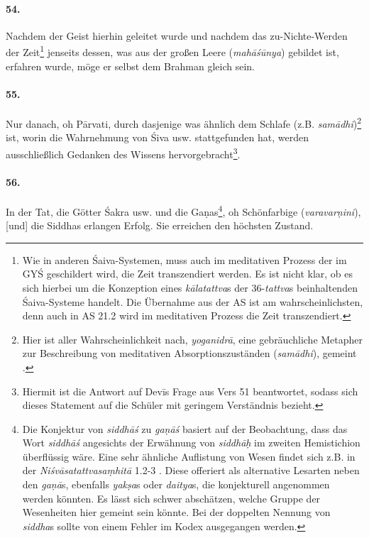 \documentclass[a4paper,12pt]{article}
\begin{document}
\paragraph{54.} Nachdem der Geist hierhin geleitet wurde und nachdem das zu-Nichte-Werden der Zeit\footnote{Wie in anderen Śaiva-Systemen, muss auch im meditativen Prozess der im GYŚ geschildert wird, die Zeit transzendiert werden. Es ist nicht klar, ob es sich hierbei um die Konzeption eines \textit{kālatattva}s der 36-\textit{tattva}s beinhaltenden Śaiva-Systeme handelt. Die Übernahme aus der AS ist am wahrscheinlichsten, denn auch in AS 21.2 wird im meditativen Prozess die Zeit transzendiert.} jenseits dessen, was aus der großen Leere (\textit{mahāśūnya}) gebildet ist, erfahren wurde, möge er selbst dem Brahman gleich sein.

\paragraph{55.} Nur danach, oh Pārvati, durch dasjenige was ähnlich dem Schlafe (z.B. \textit{samādhi})\footnote{Hier ist aller Wahrscheinlichkeit nach, \textit{yoganidrā}, eine gebräuchliche Metapher zur Beschreibung von meditativen Absorptionszuständen (\textit{samādhi}), gemeint \parencite[4]{birch2014}.} ist, worin die Wahrnehmung von Śiva usw. stattgefunden hat, werden ausschließlich Gedanken des Wissens hervorgebracht\footnote{Hiermit ist die Antwort auf Devīs Frage aus Vers 51 beantwortet, sodass sich dieses Statement auf die Schüler mit geringem Verständnis bezieht.}.

\paragraph{56.} In der Tat, die Götter Śakra usw. und die Gaṇas\footnote{Die Konjektur von \textit{siddhāś} zu \textit{gaṇāś} basiert auf der Beobachtung, dass das Wort \textit{siddhāś} angesichts der Erwähnung von \textit{siddhāḥ} im zweiten Hemistichion überflüssig wäre. Eine sehr ähnliche Auflistung von Wesen findet sich z.B. in der \textit{Niśvāsatattvasaṃhitā} 1.2-3 \parencite[137]{nishvasa2015}. Diese offeriert als alternative Lesarten neben den \textit{gaṇā}s, ebenfalls \textit{yakṣa}s oder \textit{daitya}s, die konjekturell angenommen werden könnten. Es lässt sich schwer abschätzen, welche Gruppe der Wesenheiten hier gemeint sein könnte. Bei der doppelten Nennung von \textit{siddha}s sollte von einem Fehler im Kodex ausgegangen werden.}, oh Schönfarbige (\textit{varavarṇini}), [und] die Siddhas erlangen Erfolg. Sie erreichen den höchsten Zustand.
\end{document}
